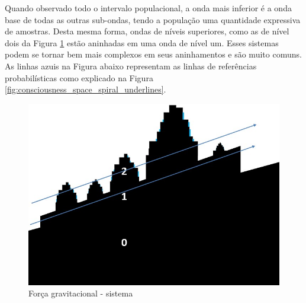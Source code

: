 Quando observado todo o intervalo populacional, a onda mais inferior é a onda base de todas as outras sub-ondas, tendo a população uma quantidade expressiva de amostras. Desta mesma forma, ondas de níveis superiores, como as de nível dois da Figura \ref{fig:consciousness_gravitational_force_system} estão aninhadas em uma onda de nível um. Esses sistemas podem se tornar bem mais complexos em seus aninhamentos e são muito comuns. As linhas azuis na Figura abaixo representam as linhas de referências probabilísticas como explicado na Figura \ref{fig:consciousness_space_spiral_underlines}.
	\begin{figure}[H]
	\caption{Força gravitacional - sistema}
	\label{fig:consciousness_gravitational_force_system}
	\centering
	\includegraphics[scale=.5]{sections/images/consciousness_gravitational_force_system.jpg}
	\end{figure}
	
